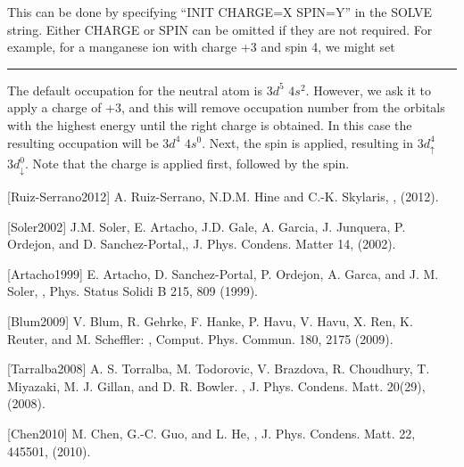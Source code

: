 \documentclass[letterpaper,10pt,english]{sphinxmanual}
\begin{document}
This can be done by specifying “INIT CHARGE=X SPIN=Y” in the SOLVE
string. Either CHARGE or SPIN can be omitted if they are not required.
For example, for a manganese ion with charge +3 and spin 4, we might set


\bigskip\hrule\bigskip





The default occupation for the neutral atom is \(3d^5\)
\(4s^2\). However, we ask it to apply a charge of +3, and this will
remove occupation number from the orbitals with the highest energy until
the right charge is obtained. In this case the resulting occupation will
be \(3d^4\) \(4s^0\). Next, the spin is applied, resulting in
\(3d_{\uparrow}^4\) \(3d_{\downarrow}^0\). Note that the charge
is applied first, followed by the spin.

{[}Ruiz-Serrano2012{]} A. Ruiz-Serrano, N.D.M. Hine and C.-K. Skylaris, , (2012).

{[}Soler2002{]} J.M. Soler, E. Artacho, J.D. Gale, A. Garcia, J. Junquera, P. Ordejon,
and D. Sanchez-Portal,, J. Phys. Condens. Matter 14, (2002).

{[}Artacho1999{]} E. Artacho, D. Sanchez-Portal, P. Ordejon, A. Garca, and J. M. Soler, , Phys. Status Solidi B 215, 809 (1999).

{[}Blum2009{]} V. Blum, R. Gehrke, F. Hanke, P. Havu, V. Havu, X. Ren, K. Reuter, and M. Scheffler: , Comput. Phys. Commun. 180, 2175 (2009).

{[}Tarralba2008{]} A. S. Torralba, M. Todorovic, V. Brazdova, R. Choudhury, T. Miyazaki, M. J. Gillan, and D. R. Bowler. , J. Phys. Condens. Matt. 20(29), (2008).

{[}Chen2010{]} M. Chen, G.-C. Guo, and L. He, , J. Phys. Condens. Matt. 22, 445501, (2010).
\end{document}
